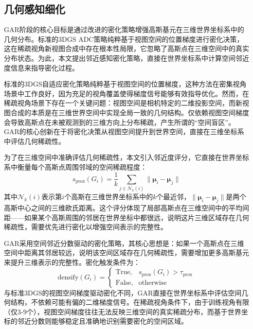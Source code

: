 \subsection{几何感知细化}

GAR阶段的核心目标是通过改进的密化策略增强高斯基元在三维世界坐标系中的几何分布。标准的3DGS ADC策略纯粹基于视图空间的位置梯度进行密化决策，这在稀疏视角新视图合成中存在根本性局限，它忽略了高斯点在三维空间中的真实分布状态。为此，本文提出邻近感知密化策略，直接在世界坐标系中计算空间邻近度信息来指导密化过程。

标准的3DGS自适应密化策略纯粹基于视图空间的位置梯度，这种方法在密集视角场景中工作良好，因为充足的视角覆盖使得梯度信号能够有效指导优化。然而，在稀疏视角场景下存在一个关键问题：视图空间是相机特定的二维投影空间，而新视图合成的本质是在三维世界空间中实现全局一致的几何结构。仅依赖视图空间梯度会导致高斯点在未被观测到的三维方向上分布稀疏，产生所谓的“空间盲区”。GAR的核心创新在于将密化决策从视图空间提升到世界空间，直接在三维坐标系中评估几何稀疏性。

为了在三维空间中准确评估几何稀疏性，本文引入邻近度评分，它直接在世界坐标系中衡量每个高斯点周围邻域的空间稀疏程度：
\begin{equation}
s_{\text{prox}}(G_i) = \frac{1}{k} \sum_{j \in \mathcal{N}_k(i)} \|\boldsymbol{\mu}_i - \boldsymbol{\mu}_j\|
\end{equation}
其中$\mathcal{N}_k(i)$表示第$i$个高斯在三维世界坐标系中的$k$个最近邻，$\|\boldsymbol{\mu}_i - \boldsymbol{\mu}_j\|$是两个高斯中心之间的三维欧氏距离。这个评分体现了局部高斯点在三维空间中的平均间距——如果某个高斯周围的邻居在世界坐标中都很远，说明这片三维区域存在几何稀疏性，需要优先进行密化以增强空间表示的完整性。

GAR采用空间邻近分数驱动的密化策略，其核心思想是：如果一个高斯点在三维空间中距离其邻居较远，说明该空间区域存在几何稀疏性，需要增加更多高斯基元来提升三维表示的完整性。密化触发条件为：
\begin{equation}
\text{densify}(G_i) = \begin{cases} \text{True}, & s_{\text{prox}}(G_i) > \tau_{\text{prox}} \\ \text{False}, & \text{otherwise} \end{cases}
\end{equation}
与标准3DGS的视图空间梯度驱动密化不同，GAR直接在世界坐标系中评估空间几何结构，不依赖可能有偏的二维梯度信号。在稀疏视角条件下，由于训练视角有限（仅3-9个），视图空间梯度往往无法反映三维空间的真实稀疏分布，而基于世界坐标的邻近分数则能够稳定且准确地识别需要密化的空间区域。


